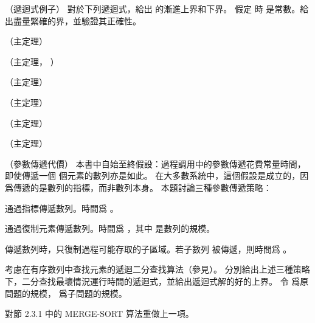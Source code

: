\startsubject[
  title={Problems},
]

\startPROBLEM（遞迴式例子）
對於下列遞迴式，給出  的漸進上界和下界。
假定  時  是常數。給出盡量緊確的界，並驗證其正確性。
\startigBase[n]
\item {}

\startANSWER
{} （主定理）
\stopANSWER

\item {}

\startANSWER
{} （主定理， ）
\stopANSWER

\item {}

\startANSWER
{} （主定理）
\stopANSWER

\item {}

\startANSWER
{} （主定理）
\stopANSWER

\item {}

\startANSWER
{} （主定理）
\stopANSWER

\item {}

\startANSWER
{} （主定理）
\stopANSWER

\item {}

\startANSWER
{}
\stopANSWER
\stopigBase
\stopPROBLEM

\startPROBLEM（參數傳遞代價）
本書中自始至終假設：過程調用中的參數傳遞花費常量時間，
即使傳遞一個  個元素的數列亦是如此。
在大多數系統中，這個假設是成立的，因爲傳遞的是數列的指標，而非數列本身。
本題討論三種參數傳遞策略：
\startigBase[n]
\item 通過指標傳遞數列。時間爲 。
\item 通過復制元素傳遞數列。時間爲 ，其中  是數列的規模。
\item 傳遞數列時，只復制過程可能存取的子區域。若子數列  被傳遞，則時間爲 。
\stopigBase
\startigBase[a]
\item[parameter_pass_cost_item]
考慮在有序數列中查找元素的遞迴二分查找算法（參見）。
分別給出上述三種策略下，二分查找最壞情況運行時間的遞迴式，並給出遞迴式解的好的上界。
令  爲原問題的規模，  爲子問題的規模。
\item 對節 2.3.1 中的 MERGE-SORT 算法重做上一項。
\stopigBase

